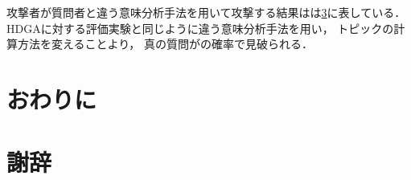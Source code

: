 \documentclass[master]{suribt}
\theoremstyle{definition}
\begin{document}
 攻撃者が質問者と違う意味分析手法を用いて攻撃する結果はは\ref{}に表している．
 HDGAに対する評価実験と同じように違う意味分析手法を用い，
 トピックの計算方法を変えることより，
 真の質問がの確率で見破られる．

 \chapter{おわりに}

 \backmatter%
 \chapter{謝辞}%


  \appendix%
  \chapter{}
  
\end{document}
